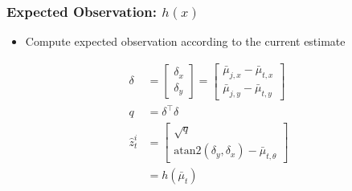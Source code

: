 \begin{frame}
    \frametitle{Expected Observation: $h(x)$}

    \begin{itemize}
        \item Compute expected observation according to the current estimate 
    \end{itemize}

    \begin{align*}
        \delta &= \begin{bmatrix}
        \delta_x \\
        \delta_y
        \end{bmatrix} = \begin{bmatrix}
        \bar{\mu}_{j,x} - \bar{\mu}_{t,x} \\
        \bar{\mu}_{j,y} - \bar{\mu}_{t,y}
        \end{bmatrix}\\
        q &= \delta^{\top} \delta\\
        \hat{z}_t^i &= \begin{bmatrix}
        \sqrt{q} \\
        \text{atan2}(\delta_y, \delta_x) - \bar{\mu}_{t,\theta}
        \end{bmatrix}\\
        &= h(\bar{\mu}_t)
    \end{align*}
\end{frame}

